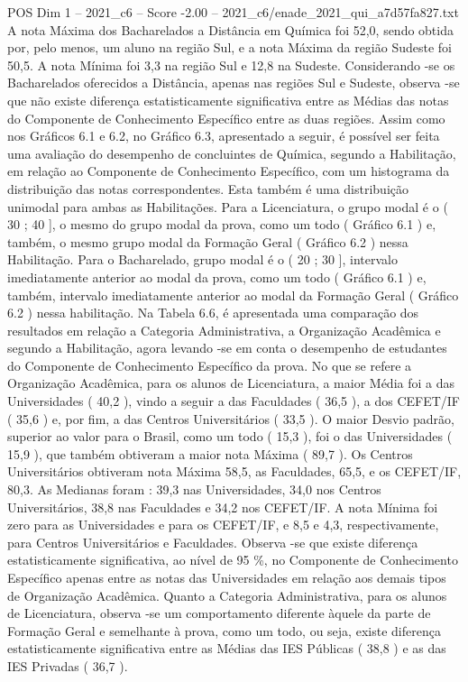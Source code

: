 \begin{textsample}{POS Dim 1 – 2021\_c6 – Score -2.00 – 2021\_c6/enade\_2021\_qui\_a7d57fa827.txt}
A nota Máxima dos Bacharelados a Distância em Química foi 52,0, sendo obtida por, pelo menos, um aluno na região Sul, e a nota Máxima da região Sudeste foi 50,5.
A nota Mínima foi 3,3 na região Sul e 12,8 na Sudeste.
Considerando -se os Bacharelados oferecidos a Distância, apenas nas regiões Sul e Sudeste, observa -se que não existe diferença estatisticamente significativa entre as Médias das notas do Componente de Conhecimento Específico entre as duas regiões.
Assim como nos Gráficos 6.1 e 6.2, no Gráfico 6.3, apresentado a seguir, é possível ser feita uma avaliação do desempenho de concluintes de Química, segundo a Habilitação, em relação ao Componente de Conhecimento Específico, com um histograma da distribuição das notas correspondentes.
Esta também é uma distribuição unimodal para ambas as Habilitações.
Para a Licenciatura, o grupo modal é o ( 30 ; 40 ], o mesmo do grupo modal da prova, como um todo ( Gráfico 6.1 ) e, também, o mesmo grupo modal da Formação Geral ( Gráfico 6.2 ) nessa Habilitação.
Para o Bacharelado, grupo modal é o ( 20 ; 30 ], intervalo imediatamente anterior ao modal da prova, como um todo ( Gráfico 6.1 ) e, também, intervalo imediatamente anterior ao modal da Formação Geral ( Gráfico 6.2 ) nessa habilitação.
Na Tabela 6.6, é apresentada uma comparação dos resultados em relação a Categoria Administrativa, a Organização Acadêmica e segundo a Habilitação, agora levando -se em conta o desempenho de estudantes do Componente de Conhecimento Específico da prova.
No que se refere a Organização Acadêmica, para os alunos de Licenciatura, a maior Média foi a das Universidades ( 40,2 ), vindo a seguir a das Faculdades ( 36,5 ), a dos CEFET/IF ( 35,6 ) e, por fim, a das Centros Universitários ( 33,5 ).
O maior Desvio padrão, superior ao valor para o Brasil, como um todo ( 15,3 ), foi o das Universidades ( 15,9 ), que também obtiveram a maior nota Máxima ( 89,7 ).
Os Centros Universitários obtiveram nota Máxima 58,5, as Faculdades, 65,5, e os CEFET/IF, 80,3.
As Medianas foram : 39,3 nas Universidades, 34,0 nos Centros Universitários, 38,8 nas Faculdades e 34,2 nos CEFET/IF.
A nota Mínima foi zero para as Universidades e para os CEFET/IF, e 8,5 e 4,3, respectivamente, para Centros Universitários e Faculdades.
Observa -se que existe diferença estatisticamente significativa, ao nível de 95 \%, no Componente de Conhecimento Específico apenas entre as notas das Universidades em relação aos demais tipos de Organização Acadêmica.
Quanto a Categoria Administrativa, para os alunos de Licenciatura, observa -se um comportamento diferente àquele da parte de Formação Geral e semelhante à prova, como um todo, ou seja, existe diferença estatisticamente significativa entre as Médias das IES Públicas ( 38,8 ) e as das IES Privadas ( 36,7 ).

\end{textsample}
